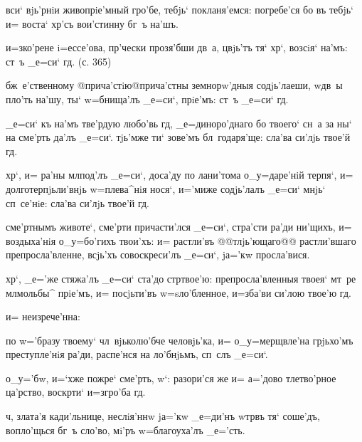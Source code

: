 {{ вси` вjь'рнiи живопрiе'мный гро'бе, тебjь` 
покланя'емся: погребе'ся бо въ тебjь` и= воста` хр'съ 
вои'стинну бг~ъ на'шъ.


 и=з\ъ ко'рене i=ессе'ова, пр'чески 
прозя'бши дв~а, цвjь'тъ тя` хр`, возсiя` на'мъ: ст~ъ 
_е=си` гд. (с. 365)

 бж~е'ственному @прича'стiю@{прича'стны} 
земнорw'дныя содjь'лаеши, w\т дв~ы пло'ть на'шу, ты` 
w=бнища'лъ _е=си`, прiе'мъ: ст~ъ _е=си` гд.


  _е=си` къ на'мъ тве'рдую 
любо'вь гд, _е=диноро'днаго бо твоего` сн~а за ны` на 
сме'рть да'лъ _е=си`. тjь'мже ти` зове'мъ бл~годаря'ще: 
сла'ва си'лjь твое'й гд.

 хр`, и= ра'ны мл под'лъ 
_е=си`, доса'ду по лани'тома о_у=даре'нiй терпя`, и= 
долготерпjьли'внjь w=плева^нiя нося`, и='миже содjь'лалъ 
_е=си` мнjь` сп~се'нiе: сла'ва си'лjь твое'й гд.

 сме'ртнымъ животе`, сме'рти причасти'лся 
_е=си`, стра'сти ра'ди ни'щихъ, и= воздыха'нiя 
о_у=бо'гихъ твои'хъ: и= растли'въ @@тлjь'ющаго@@ 
{растли'вшаго} препросла'вленне, всjь'хъ совоскреси'лъ 
_е=си`, jа='кw просла'вися.

  хр`, _е='же стяжа'лъ 
_е=си` ста'до стр твое'ю: препросла'вленныя твоея` 
мт~ре мл мольбы^ прiе'мъ, и= посjьти'въ 
w=sло'бленное, и=зба'ви си'лою твое'ю гд.

   и= неизрече'нна:

 по w='бразу твоему` чл~вjьколю'бче 
человjь'ка, и= о_у=мерщвле'на грjьхо'мъ преступле'нiя 
ра'ди, распе'нся на ло'бнjьмъ, сп~слъ _е=си`.

 о_у='бw, и=`хже пожре` сме'рть, 
w`: разори'ся же и= а='дово тлетво'рное ца'рство, 
воскр ти` и=з\ъ гро'ба гд.

  ч, злата'я кади'льнице, 
неслiя'ннw jа='кw _е=ди'нъ w\т тр въ тя` соше'дъ, 
вопло'щься бг~ъ сло'во, мi'ръ w=благоуха'лъ _е='сть.


}}
